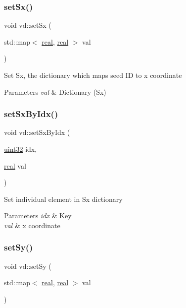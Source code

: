 \subsubsection{\texorpdfstring{set\+Sx()}{setSx()}}
{\footnotesize\ttfamily void vd\+::set\+Sx (\begin{DoxyParamCaption}\item[{std\+::map$<$ \mbox{\hyperlink{typedefs_8cpp_a58a0c7cf2501f4492da833421be92547}{real}}, \mbox{\hyperlink{typedefs_8cpp_a58a0c7cf2501f4492da833421be92547}{real}} $>$}]{val }\end{DoxyParamCaption})}

Set Sx, the dictionary which maps seed ID to x coordinate 
\begin{DoxyParams}{Parameters}
{\em val} & Dictionary (Sx) \\
\hline
\end{DoxyParams}
\mbox{\label{classvd_a440d47d94f489ceefa9037be51daef66}} 
\subsubsection{\texorpdfstring{set\+Sx\+By\+Idx()}{setSxByIdx()}}
{\footnotesize\ttfamily void vd\+::set\+Sx\+By\+Idx (\begin{DoxyParamCaption}\item[{\mbox{\hyperlink{typedefs_8cpp_a8ad23e2333787a214e20a58a284a5a60}{uint32}}}]{idx,  }\item[{\mbox{\hyperlink{typedefs_8cpp_a58a0c7cf2501f4492da833421be92547}{real}}}]{val }\end{DoxyParamCaption})}

Set individual element in Sx dictionary 
\begin{DoxyParams}{Parameters}
{\em idx} & Key \\
\hline
{\em val} & x coordinate \\
\hline
\end{DoxyParams}
\mbox{\label{classvd_af103a45c726643e96f69be4363ad2409}} 
\subsubsection{\texorpdfstring{set\+Sy()}{setSy()}}
{\footnotesize\ttfamily void vd\+::set\+Sy (\begin{DoxyParamCaption}\item[{std\+::map$<$ \mbox{\hyperlink{typedefs_8cpp_a58a0c7cf2501f4492da833421be92547}{real}}, \mbox{\hyperlink{typedefs_8cpp_a58a0c7cf2501f4492da833421be92547}{real}} $>$}]{val }\end{DoxyParamCaption})}

